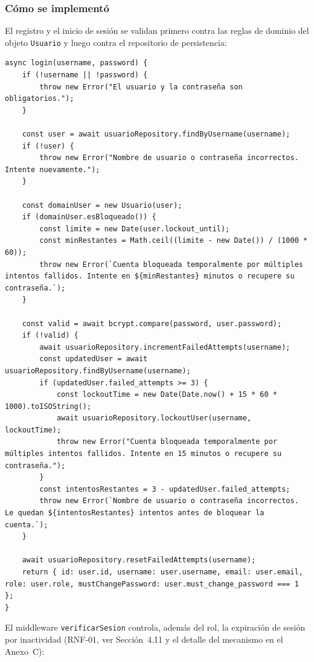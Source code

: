 \documentclass[12pt,a4paper]{article}
\begin{document}
\subsubsection*{Cómo se implementó}

El registro y el inicio de sesión se validan primero contra las reglas de dominio del
objeto \texttt{Usuario} y luego contra el repositorio de persistencia:

\begin{lstlisting}[caption={\texttt{AuthService.login} — validación de credenciales y bloqueo temporal (\texttt{src/core/business/services/AuthService.js})}]
async login(username, password) {
    if (!username || !password) {
        throw new Error("El usuario y la contraseña son obligatorios.");
    }

    const user = await usuarioRepository.findByUsername(username);
    if (!user) {
        throw new Error("Nombre de usuario o contraseña incorrectos. Intente nuevamente.");
    }

    const domainUser = new Usuario(user);
    if (domainUser.esBloqueado()) {
        const limite = new Date(user.lockout_until);
        const minRestantes = Math.ceil((limite - new Date()) / (1000 * 60));
        throw new Error(`Cuenta bloqueada temporalmente por múltiples intentos fallidos. Intente en ${minRestantes} minutos o recupere su contraseña.`);
    }

    const valid = await bcrypt.compare(password, user.password);
    if (!valid) {
        await usuarioRepository.incrementFailedAttempts(username);
        const updatedUser = await usuarioRepository.findByUsername(username);
        if (updatedUser.failed_attempts >= 3) {
            const lockoutTime = new Date(Date.now() + 15 * 60 * 1000).toISOString();
            await usuarioRepository.lockoutUser(username, lockoutTime);
            throw new Error("Cuenta bloqueada temporalmente por múltiples intentos fallidos. Intente en 15 minutos o recupere su contraseña.");
        }
        const intentosRestantes = 3 - updatedUser.failed_attempts;
        throw new Error(`Nombre de usuario o contraseña incorrectos. Le quedan ${intentosRestantes} intentos antes de bloquear la cuenta.`);
    }

    await usuarioRepository.resetFailedAttempts(username);
    return { id: user.id, username: user.username, email: user.email, role: user.role, mustChangePassword: user.must_change_password === 1 };
}
\end{lstlisting}

El middleware \texttt{verificarSesion} controla, además del rol, la expiración de sesión
por inactividad (RNF-01, ver Sección~4.11 y el detalle del mecanismo en el Anexo~C):
\end{document}

